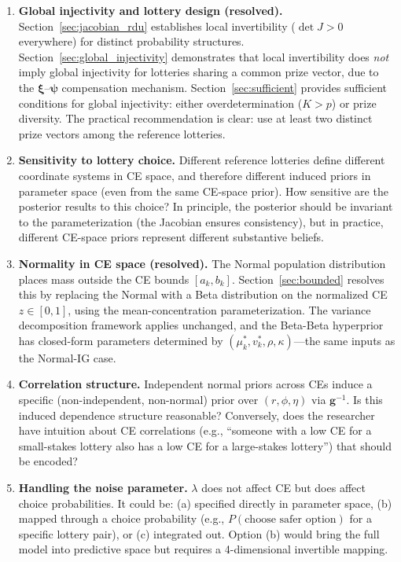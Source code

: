 \documentclass[11pt,a4paper]{article}
\theoremstyle{definition}
\begin{document}
\begin{enumerate}
    \item \textbf{Global injectivity and lottery design (resolved).}
    Section~\ref{sec:jacobian_rdu} establishes local invertibility ($\det J > 0$
    everywhere) for distinct probability structures.
    Section~\ref{sec:global_injectivity} demonstrates that local invertibility
    does \emph{not} imply global injectivity for lotteries sharing a common
    prize vector, due to the $\bm{\xi}$--$\bm{\psi}$ compensation mechanism.
    Section~\ref{sec:sufficient} provides sufficient conditions for global
    injectivity: either overdetermination ($K > p$) or prize diversity. The
    practical recommendation is clear: use at least two distinct prize vectors
    among the reference lotteries.

    \item \textbf{Sensitivity to lottery choice.} Different reference lotteries
    define different coordinate systems in CE space, and therefore different
    induced priors in parameter space (even from the same CE-space prior). How
    sensitive are the posterior results to this choice? In principle, the
    posterior should be invariant to the parameterization (the Jacobian ensures
    consistency), but in practice, different CE-space priors represent different
    substantive beliefs.

    \item \textbf{Normality in CE space (resolved).} The Normal population
    distribution places mass outside the CE bounds $[a_k, b_k]$.
    Section~\ref{sec:bounded} resolves this by replacing the Normal with a
    Beta distribution on the normalized CE $z \in [0,1]$, using the
    mean-concentration parameterization. The variance decomposition framework
    applies unchanged, and the Beta-Beta hyperprior has closed-form parameters
    determined by $(\mu_k^*, v_k^*, \rho, \kappa)$---the same inputs as the
    Normal-IG case.

    \item \textbf{Correlation structure.} Independent normal priors across CEs
    induce a specific (non-independent, non-normal) prior over $(r, \phi, \eta)$
    via $\mathbf{g}^{-1}$. Is this induced dependence structure reasonable?
    Conversely, does the researcher have intuition about CE correlations (e.g.,
    ``someone with a low CE for a small-stakes lottery also has a low CE for a
    large-stakes lottery'') that should be encoded?

    \item \textbf{Handling the noise parameter.} $\lambda$ does not affect CE
    but does affect choice probabilities. It could be: (a) specified directly in
    parameter space, (b) mapped through a choice probability (e.g., $P(\text{choose
    safer option})$ for a specific lottery pair), or (c) integrated out. Option
    (b) would bring the full model into predictive space but requires a
    4-dimensional invertible mapping.
\end{enumerate}
\end{document}
